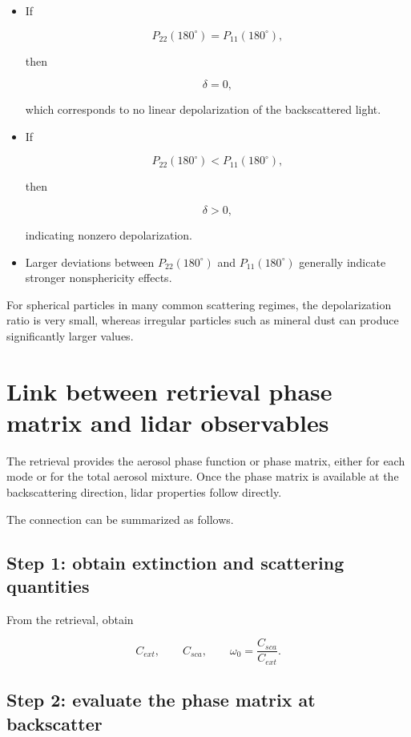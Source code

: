 \documentclass[
  letterpaper,
]{scrbook}
\begin{document}
\begin{itemize}
\item
  If

  \[
  P_{22}(180^\circ)=P_{11}(180^\circ),
  \]

  then

  \[
  \delta = 0,
  \]

  which corresponds to no linear depolarization of the backscattered
  light.
\item
  If

  \[
  P_{22}(180^\circ)<P_{11}(180^\circ),
  \]

  then

  \[
  \delta > 0,
  \]

  indicating nonzero depolarization.
\item
  Larger deviations between \(P_{22}(180^\circ)\) and
  \(P_{11}(180^\circ)\) generally indicate stronger nonsphericity
  effects.
\end{itemize}

For spherical particles in many common scattering regimes, the
depolarization ratio is very small, whereas irregular particles such as
mineral dust can produce significantly larger values.

\section{Link between retrieval phase matrix and lidar
observables}\label{link-between-retrieval-phase-matrix-and-lidar-observables}

The retrieval provides the aerosol phase function or phase matrix,
either for each mode or for the total aerosol mixture. Once the phase
matrix is available at the backscattering direction, lidar properties
follow directly.

The connection can be summarized as follows.

\subsection{Step 1: obtain extinction and scattering
quantities}\label{step-1-obtain-extinction-and-scattering-quantities}

From the retrieval, obtain

\[
C_{ext}, \qquad C_{sca}, \qquad \omega_0=\frac{C_{sca}}{C_{ext}}.
\]

\subsection{Step 2: evaluate the phase matrix at
backscatter}\label{step-2-evaluate-the-phase-matrix-at-backscatter}
\end{document}

